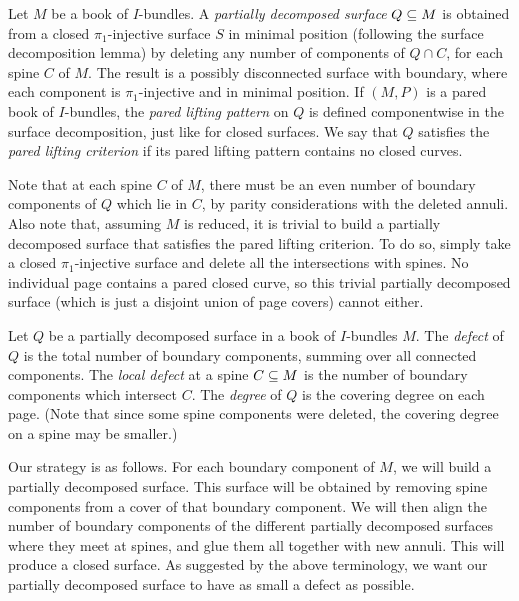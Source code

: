 \begin{defn}

Let $M$ be a book of $I$-bundles. A \emph{partially decomposed surface} $Q \subseteq
M$ is obtained from a closed $\pi_1$-injective surface $S$ in minimal position
(following the surface decomposition lemma) by deleting any number of
components of $Q \cap C$, for each spine $C$ of $M$. The result is a possibly
disconnected surface with boundary, where each component is $\pi_1$-injective
and in minimal position. If $(M,P)$ is a pared book of $I$-bundles, the
\emph{pared lifting pattern} on $Q$ is defined componentwise in the surface
decomposition, just like for closed surfaces. We say that $Q$ satisfies the
\emph{pared lifting criterion} if its pared lifting pattern contains no closed
curves.

\end{defn}

Note that at each spine $C$ of $M$, there must be an even number of boundary
components of $Q$ which lie in $C$, by parity considerations with the deleted
annuli. Also note that, assuming $M$ is reduced, it is trivial to build
a partially decomposed surface that satisfies the pared lifting criterion. To
do so, simply take a closed $\pi_1$-injective surface and delete all the
intersections with spines.  No individual page contains a pared closed curve,
so this trivial partially decomposed surface (which is just a disjoint union of
page covers) cannot either.

\begin{defn}

Let $Q$ be a partially decomposed surface in a book of $I$-bundles $M$. The
\emph{defect} of $Q$ is the total number of boundary components, summing over
all connected components. The \emph{local defect} at a spine $C \subseteq M$ is the
number of boundary components which intersect $C$. The \emph{degree} of $Q$ is
the covering degree on each page. (Note that since some spine components were
deleted, the covering degree on a spine may be smaller.)

\end{defn}

Our strategy is as follows. For each boundary component of $M$, we will build
a partially decomposed surface. This surface will be obtained by removing spine
components from a cover of that boundary component. We will then align the
number of boundary components of the different partially decomposed surfaces
where they meet at spines, and glue them all together with new annuli. This
will produce a closed surface. As suggested by the above terminology, we want
our partially decomposed surface to have as small a defect as possible.

